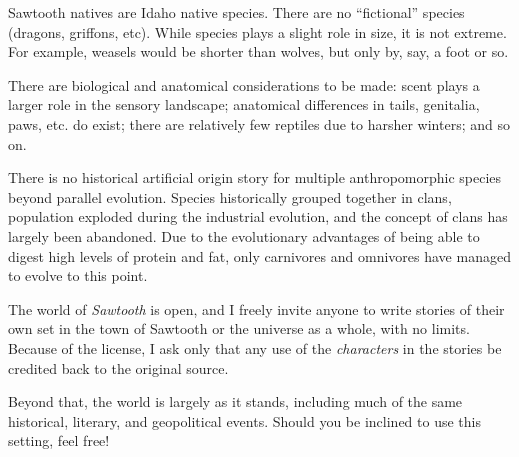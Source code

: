 Sawtooth natives are Idaho native species. There are no ``fictional'' species (dragons, griffons, etc). While species plays a slight role in size, it is not extreme. For example, weasels would be shorter than wolves, but only by, say, a foot or so.

There are biological and anatomical considerations to be made: scent plays a larger role in the sensory landscape; anatomical differences in tails, genitalia, paws, etc. do exist; there are relatively few reptiles due to harsher winters; and so on.

There is no historical artificial origin story for multiple anthropomorphic species beyond parallel evolution. Species historically grouped together in clans, population exploded during the industrial evolution, and the concept of clans has largely been abandoned. Due to the evolutionary advantages of being able to digest high levels of protein and fat, only carnivores and omnivores have managed to evolve to this point.

The world of \emph{Sawtooth} is open, and I freely invite anyone to write stories of their own set in the town of Sawtooth or the universe as a whole, with no limits. Because of the license, I ask only that any use of the \emph{characters} in the stories be credited back to the original source.

Beyond that, the world is largely as it stands, including much of the same historical, literary, and geopolitical events. Should you be inclined to use this setting, feel free!

\chapter*{}


